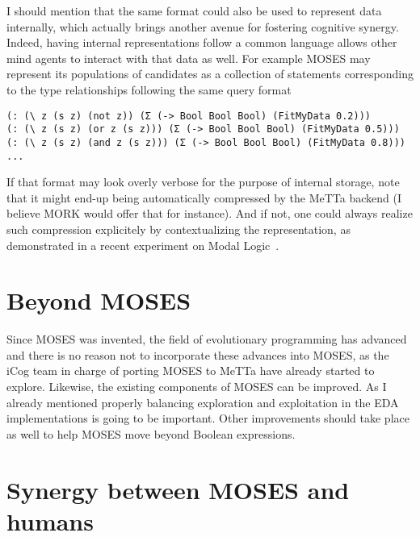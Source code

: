 \documentclass[]{report}
\begin{document}
I should mention that the same format could also be used to represent
data internally, which actually brings another avenue for fostering
cognitive synergy.  Indeed, having internal representations follow a
common language allows other mind agents to interact with that data as
well.  For example MOSES may represent its populations of candidates
as a collection of statements corresponding to the type relationships
following the same query format

{\small
\begin{verbatim}
(: (\ z (s z) (not z)) (Σ (-> Bool Bool Bool) (FitMyData 0.2)))
(: (\ z (s z) (or z (s z))) (Σ (-> Bool Bool Bool) (FitMyData 0.5)))
(: (\ z (s z) (and z (s z))) (Σ (-> Bool Bool Bool) (FitMyData 0.8)))
...
\end{verbatim}
} If that format may look overly verbose for the purpose of internal
storage, note that it might end-up being automatically compressed by
the MeTTa backend (I believe MORK would offer that for instance).  And
if not, one could always realize such compression explicitely by
contextualizing the representation, as demonstrated in a recent
experiment on Modal Logic~\cite{ModalLogic}.

\section{Beyond MOSES}

Since MOSES was invented, the field of evolutionary programming has
advanced and there is no reason not to incorporate these advances into
MOSES, as the iCog team in charge of porting MOSES to MeTTa have
already started to explore.  Likewise, the existing components of
MOSES can be improved.  As I already mentioned properly balancing
exploration and exploitation in the EDA implementations is going to be
important.  Other improvements should take place as well to help MOSES
move beyond Boolean expressions.

\section{Synergy between MOSES and humans}



\end{document}
